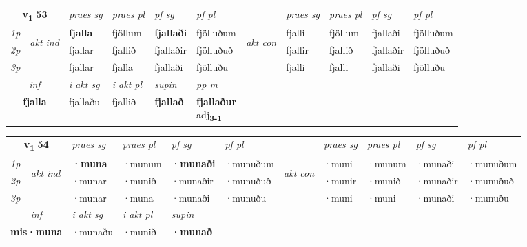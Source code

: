 \noindent
\begin{tabular}{lllllllllll} \toprule
\multicolumn{2}{c}{\textbf{v{\textsubscript{1}}} \Large{\textbf{53}}}  &  \textit{praes sg}  & \textit{praes pl}  &\textit{ pf sg} & \textit{pf pl} &  &  \textit{praes sg}  & \textit{praes pl}  & \textit{pf sg} & \textit{pf pl } \\*
	\cmidrule{3-6} \cmidrule{8-11}
 {\textit{1p}} & \multirow{3}{*}{\begin{turn}{90}\textit{akt ind}\end{turn}} & \textbf{fjalla} & fjöllum & \textbf{fjallaði} & fjölluðum & \multirow{3}{*}{\begin{turn}{90}\textit{akt con}\end{turn}} &fjalli & fjöllum & fjallaði & fjölluðum\\*
 {\textit{2p}} &  &  fjallar  & fjallið & fjallaðir & fjölluðuð & & fjallir & fjallið & fjallaðir & fjölluðuð \\*
{\textit{3p}} &  & fjallar & fjalla & fjallaði & fjölluðu & & fjalli & fjalli& fjallaði & fjölluðu \\*
\cmidrule{3-6} \cmidrule{8-11}

   \multicolumn{2}{c}{\textit{inf}}  & \textit{i akt sg} & \textit{i akt pl}    & \textit{supin}  & \textit{pp m} \\*
  \multicolumn{2}{c}{\textbf{fjalla}} & fjallaðu  & fjallið    &  \textbf{fjallað}  & \specialcell{\textbf{fjallaður} \\ adj\textbf{\textsubscript{3-1}}} \\*
\end{tabular}

\noindent
\begin{tabular}{lllllllllll} \toprule
\multicolumn{2}{c}{\textbf{v{\textsubscript{1}}} \Large{\textbf{54}}}  &  \textit{praes sg}  & \textit{praes pl}  &\textit{ pf sg} & \textit{pf pl} &  &  \textit{praes sg}  & \textit{praes pl}  & \textit{pf sg} & \textit{pf pl } \\*
	\cmidrule{3-6} \cmidrule{8-11}
 {\textit{1p}} & \multirow{3}{*}{\begin{turn}{90}\textit{akt ind}\end{turn}} & \textbf{·muna} & ·munum & \textbf{·munaði} & ·munuðum & \multirow{3}{*}{\begin{turn}{90}\textit{akt con}\end{turn}} &·muni & ·munum & ·munaði & ·munuðum\\*
 {\textit{2p}} &  &  ·munar  & ·munið & ·munaðir & ·munuðuð & & ·munir & ·munið & ·munaðir & ·munuðuð \\*
{\textit{3p}} &  & ·munar & ·muna & ·munaði & ·munuðu & & ·muni & ·muni& ·munaði & ·munuðu \\*
\cmidrule{3-6} \cmidrule{8-11}

   \multicolumn{2}{c}{\textit{inf}}  & \textit{i akt sg} & \textit{i akt pl}    & \textit{supin}   \\*
  \multicolumn{2}{c}{\textbf{mis\allowbreak ·muna}} & ·munaðu  & ·munið    &  \textbf{·munað}   \\*
\end{tabular}

